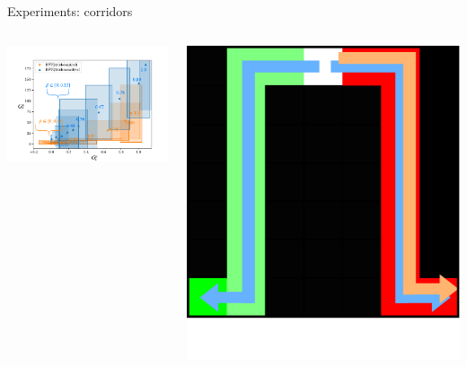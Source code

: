 \documentclass{beamer}
\begin{document}
    \begin{frame}{Experiments: corridors}

        \begin{columns}
            \begin{column}{0.7\textwidth}
                \includegraphics[page=1, width=\textwidth]{img/corridors}
            \end{column}
            \begin{column}{0.3\textwidth}  %
                \begin{center}
                    \includegraphics[width=\textwidth]{img/test.pdf}
                \end{center}
            \end{column}
        \end{columns}
    \end{frame}
\end{document}
